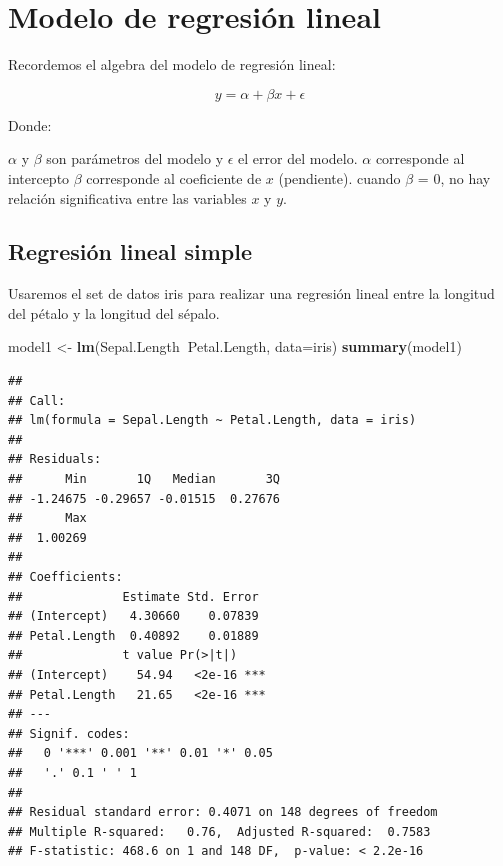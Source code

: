 \documentclass[
]{book}
\newenvironment{Shaded}{\begin{snugshade}}{\end{snugshade}}
\newcommand{\DataTypeTok}[1]{\textcolor[rgb]{0.13,0.29,0.53}{#1}}
\newcommand{\KeywordTok}[1]{\textcolor[rgb]{0.13,0.29,0.53}{\textbf{#1}}}
\newcommand{\NormalTok}[1]{#1}
\newcommand{\OperatorTok}[1]{\textcolor[rgb]{0.81,0.36,0.00}{\textbf{#1}}}
\newcommand{\StringTok}[1]{\textcolor[rgb]{0.31,0.60,0.02}{#1}}
\begin{document}
\hypertarget{modelo-de-regresiuxf3n-lineal}{%
\chapter{Modelo de regresión lineal}\label{modelo-de-regresiuxf3n-lineal}}

Recordemos el algebra del modelo de regresión lineal:

\begin{equation} 
y = \alpha + \beta x + \epsilon
  \label{eq:binom}
\end{equation}

Donde:

\(\alpha\) y \(\beta\) son parámetros del modelo y \(\epsilon\) el error del modelo.
\(\alpha\) corresponde al intercepto
\(\beta\) corresponde al coeficiente de \(x\) (pendiente).
cuando \(\beta\) = 0, no hay relación significativa entre las variables \(x\) y \(y\).

\hypertarget{regresiuxf3n-lineal-simple}{%
\section{Regresión lineal simple}\label{regresiuxf3n-lineal-simple}}

Usaremos el set de datos iris para realizar una regresión lineal entre la longitud del pétalo y la longitud del sépalo.

\begin{Shaded}
\begin{Highlighting}[]
\NormalTok{model1 <-}\StringTok{ }\KeywordTok{lm}\NormalTok{(Sepal.Length}\OperatorTok{~}\NormalTok{Petal.Length, }\DataTypeTok{data=}\NormalTok{iris)}
\KeywordTok{summary}\NormalTok{(model1)}
\end{Highlighting}
\end{Shaded}

\begin{verbatim}
## 
## Call:
## lm(formula = Sepal.Length ~ Petal.Length, data = iris)
## 
## Residuals:
##      Min       1Q   Median       3Q 
## -1.24675 -0.29657 -0.01515  0.27676 
##      Max 
##  1.00269 
## 
## Coefficients:
##              Estimate Std. Error
## (Intercept)   4.30660    0.07839
## Petal.Length  0.40892    0.01889
##              t value Pr(>|t|)    
## (Intercept)    54.94   <2e-16 ***
## Petal.Length   21.65   <2e-16 ***
## ---
## Signif. codes:  
##   0 '***' 0.001 '**' 0.01 '*' 0.05
##   '.' 0.1 ' ' 1
## 
## Residual standard error: 0.4071 on 148 degrees of freedom
## Multiple R-squared:   0.76,  Adjusted R-squared:  0.7583 
## F-statistic: 468.6 on 1 and 148 DF,  p-value: < 2.2e-16
\end{verbatim}
\end{document}
